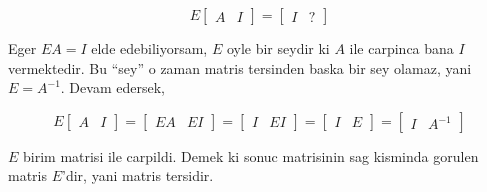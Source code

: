\documentclass[12pt,fleqn]{article}\usepackage{../common}
\begin{document}
$$ E \left[\begin{array}{rr}A & I\end{array}\right] = 
\left[\begin{array}{rr}I & ?\end{array}\right]
$$

Eger $EA = I$ elde edebiliyorsam, $E$ oyle bir seydir ki $A$ ile carpinca
bana $I$ vermektedir. Bu ``sey'' o zaman matris tersinden baska bir sey
olamaz, yani $E = A^{-1}$. Devam edersek,

$$ E \left[\begin{array}{rr}A & I\end{array}\right] = 
\left[\begin{array}{rr}EA & EI\end{array}\right] =
\left[\begin{array}{rr}I & EI\end{array}\right] =
\left[\begin{array}{rr}I & E\end{array}\right] =
\left[\begin{array}{rr}I & A^{-1}\end{array}\right]
$$

$E$ birim matrisi ile carpildi. Demek ki sonuc matrisinin sag kisminda
gorulen matris $E$'dir, yani matris tersidir.
\end{document}
